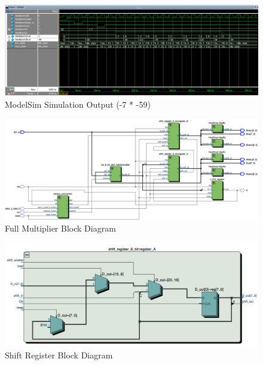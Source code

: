 \documentclass[journal, twocolumn, final,11pt,letterpaper]{IEEEtran}
\begin{document}
\begin{figure} [htbp]
	\centering
	\includegraphics[scale=0.4]{simulation4.png}
	\caption{ModelSim Simulation Output (-7 * -59)\label{fig:simulation4}}
\end{figure}

\begin{figure} [htbp]
	\centering
	\includegraphics[scale=0.4]{full-multiplier-diagram.png}
	\caption{Full Multiplier Block Diagram\label{fig:full-multiplier-diagram}}
\end{figure}

\begin{figure} [htbp]
	\centering
	\includegraphics[scale=0.5]{shift-register-diagram.png}
	\caption{Shift Register Block Diagram\label{fig:shift-register-diagram}}
\end{figure}
\end{document}
